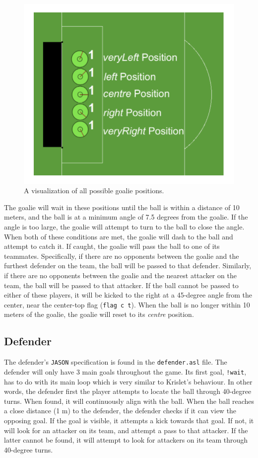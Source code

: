 \documentclass[conference]{IEEEtran}
\begin{document}
\begin{figure}[ht!]
    \centering\centerline{\includegraphics[width=.3\textwidth]{Figures/GoaliePositions.pdf}}
    \caption{A visualization of all possible goalie positions.}
    \label{fig:goaliePositions}
\end{figure}

The goalie will wait in these positions until the ball is within a distance of 10 meters, and the ball is at a minimum angle of 7.5 degrees from the goalie. If the angle is too large, the goalie will attempt to turn to the ball to close the angle. When both of these conditions are met, the goalie will dash to the ball and attempt to catch it. If caught, the goalie will pass the ball to one of its teammates. Specifically, if there are no opponents between the goalie and the furthest defender on the team, the ball will be passed to that defender. Similarly, if there are no opponents between the goalie and the nearest attacker on the team, the ball will be passed to that attacker. If the ball cannot be passed to either of these players, it will be kicked to the right at a 45-degree angle from the center, near the center-top flag (\texttt{flag c t}). When the ball is no longer within 10 meters of the goalie, the goalie will reset to its \textit{centre} position.

\subsection{Defender}\label{AA}
The defender's \texttt{JASON} specification is found in the \texttt{defender.asl} file. The defender will only have 3 main goals throughout the game. Its first goal, \texttt{!wait}, has to do with its main loop which is very similar to Krislet's behaviour. In other words, the defender first 
the player attempts to locate the ball through 40-degree turns. When found, it will continuously align with the ball. When the ball reaches a close distance (1 m) to the defender, the defender checks if it can view the opposing goal. If the goal is visible, it attempts a kick towards that goal. If not, it will look for an attacker on its team, and attempt a pass to that attacker. If the latter cannot be found, it will attempt to look for attackers on its team through 40-degree turns.
\end{document}
